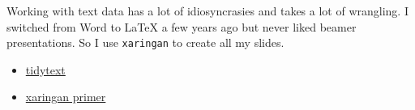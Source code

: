 \documentclass[]{tufte-handout}
\providecommand{\tightlist}{%
  \setlength{\itemsep}{0pt}\setlength{\parskip}{0pt}}
\begin{document}
Working with text data has a lot of idiosyncrasies and takes a lot of
wrangling. I switched from Word to LaTeX a few years ago but never liked
beamer presentations. So I use \texttt{xaringan} to create all my
slides.

\begin{itemize}
\tightlist
\item
  \href{https://www.tidytextmining.com/index.html}{tidytext}
\item
  \href{https://apreshill.github.io/data-vis-labs-2018/slides.html}{xaringan
  primer}
\end{itemize}
\end{document}
